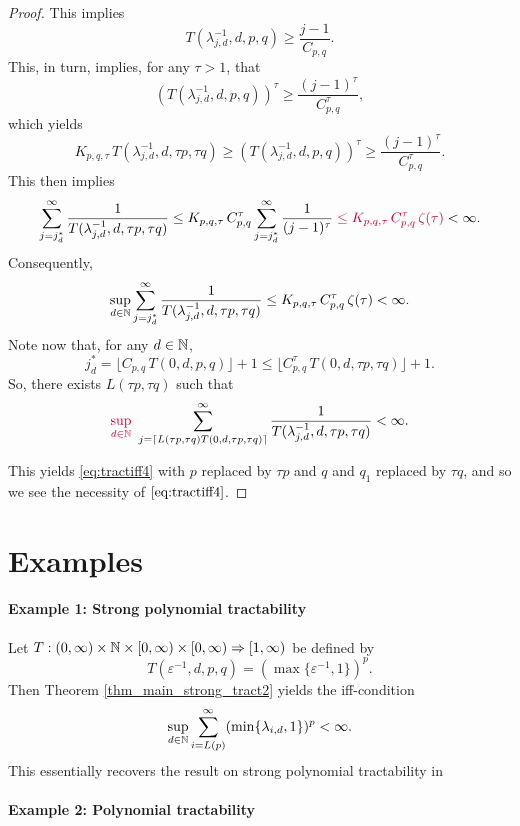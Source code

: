 \documentclass[11pt,a4paper]{article}
\newcommand{\peter}[1]{\begingroup\color{purple}#1\endgroup}
\begin{document}
\begin{proof}
This implies
\[
T(\lambda_{j,d}^{-1},d, p,q) \ge \frac{j-1}{C_{p,q}}.
\]
This, in turn, implies, for any $\tau>1$, that
\[
 (T(\lambda_{j,d}^{-1},d,p,q))^\tau \ge \frac{(j-1)^\tau}{C_{p,q}^\tau},
\]
which yields
\[
 K_{p,q,\tau}\, T (\lambda_{j,d}^{-1},d,\tau p,\tau q) \ge (T(\lambda_{j,d}^{-1},d, p,q))^\tau
 \ge \frac{(j-1)^\tau}{C_{p,q}^\tau}.
\]
This then implies
\[
\sum_{j=j_d^*}^\infty \frac{1}{T(\lambda_{j,d}^{-1},d, \tau p,\tau q)}
\le K_{p,q,\tau}\, C_{p,q}^\tau \sum_{j=j_d^*}^\infty \frac{1}{(j-1)^\tau}
\peter{\le K_{p,q,\tau}\, C_{p,q}^\tau \, \zeta(\tau)}
<\infty.
\]
\peter{
Consequently,
\[
\sup_{d\in\mathbb{N}} \sum_{j=j_d^*}^\infty \frac{1}{T(\lambda_{j,d}^{-1},d, \tau p,\tau q)} \le K_{p,q,\tau}\, C_{p,q}^\tau \, \zeta(\tau) < \infty.
\]
}
Note now that, \peter{for any $d\in\mathbb{N}$,}
\[
 j_d^* = \lfloor C_{p,q}\, T(0,d,p,q)\rfloor +1 \le \lfloor C_{p,q}^\tau\, T(0,d,\tau p,\tau q)\rfloor +1.
\]
So, there exists $L(\tau p,\tau q)$ such that
\[
\peter{\sup_{d\in\naturals}}\,\, \sum_{j=\lceil L(\tau p,\tau q) T(0,d,\tau p,\tau q)\rceil}^\infty \frac{1}{T(\lambda_{j,d}^{-1},d, \tau p,\tau q)}<\infty.
\]


This yields \eqref{eq:tractiff4} with $p$ replaced by $\tau p$ and $q$ and $q_1$ replaced by $\tau q$, and so we see the necessity of $\eqref{eq:tractiff4}$.

\end{proof}


\section{Examples}

\paragraph{Example 1: Strong polynomial tractability}

Let $T: (0,\infty) \times \mathbb{N} \times [0,\infty) \times [0,\infty)\Rightarrow [1,\infty)$
be defined by
\[
 T(\varepsilon^{-1},d,p,q)= (\max\{\varepsilon^{-1},1\})^p .
\]
Then Theorem \ref{thm_main_strong_tract2} yields the iff-condition
\[
 \sup_{d\in\mathbb{N}} \sum_{i=L(p)}^\infty (\min\{\lambda_{i,d},1\})^p < \infty.
\]
This essentially recovers the result on strong polynomial tractability in \cite[Theorem 5.1]{NW08}

\paragraph{Example 2: Polynomial tractability}
\end{document}
